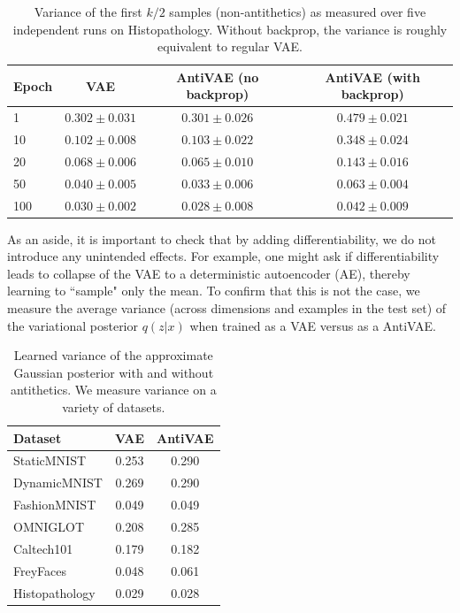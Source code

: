 \begin{table}
\small
\centering
\begin{tabular}{l|ccc}
    Epoch & VAE & AntiVAE (no backprop) & AntiVAE (with backprop) \\
    \toprule
    1 & $0.302 \pm  0.031$ & $0.301 \pm 0.026$ & $0.479 \pm 0.021$\\
    10 & $0.102 \pm 0.008$ & $0.103 \pm 0.022$ & $0.348 \pm 0.024$ \\
    20 & $0.068 \pm 0.006$ & $0.065 \pm 0.010$ &  $0.143 \pm 0.016$ \\
    50 & $0.040 \pm 0.005$ & $0.033 \pm 0.006$ & $0.063 \pm 0.004$ \\
    100 & $0.030 \pm 0.002$ & $0.028 \pm 0.008$ & $0.042 \pm 0.009$ \\
\end{tabular}
\caption{Variance of the first $k/2$ samples (non-antithetics) as measured over five independent runs on Histopathology. Without backprop, the variance is roughly equivalent to regular VAE.}
\label{table:diff_study}
\end{table}

As an aside, it is important to check that by adding differentiability, we do not introduce any unintended effects. For example, one might ask if differentiability leads to collapse of the VAE to a deterministic autoencoder (AE), thereby learning to ``sample" only the mean. To confirm that this is not the case, we measure the average variance (across dimensions and examples in the test set) of the variational posterior $q(z|x)$ when trained as a VAE versus as a AntiVAE.

\begin{table}
\small
\centering
\begin{tabular}{l|cc}
    Dataset & VAE & AntiVAE \\
    \toprule
    StaticMNIST & 0.253 & 0.290 \\
    DynamicMNIST & 0.269 & 0.290 \\
    FashionMNIST & 0.049 & 0.049 \\
    OMNIGLOT & 0.208 & 0.285\\
    Caltech101 & 0.179 & 0.182\\
    FreyFaces & 0.048 & 0.061\\
    Histopathology & 0.029 & 0.028\\
\end{tabular}
\caption{Learned variance of the approximate Gaussian posterior with and without antithetics. We measure variance on a variety of datasets.}
\label{table:collapse_study}
\end{table}


